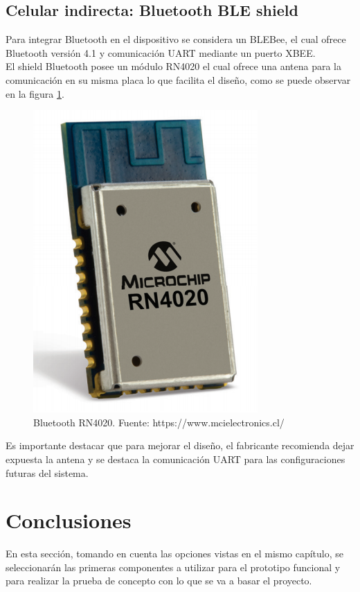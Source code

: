 \subsection{Celular indirecta: Bluetooth BLE shield}
Para integrar Bluetooth en el dispositivo se considera un BLEBee, el cual ofrece Bluetooth versión 4.1 y comunicación UART mediante un puerto XBEE. \\
El shield Bluetooth posee un módulo RN4020\cite{RN4020} el cual ofrece una antena para la comunicación en su misma placa lo que facilita el diseño, como se puede observar en la figura \ref{bt}.

\begin{figure}[H]
	\centering
	\includegraphics[scale=0.5]{figuras/com/rn4020.png}
	\caption{Bluetooth RN4020. Fuente: https://www.mcielectronics.cl/}
	\label{bt}
\end{figure}

Es importante destacar que para mejorar el diseño, el fabricante recomienda dejar expuesta la antena y se destaca la comunicación UART para las configuraciones futuras del sistema.

\newpage

\section{Conclusiones}
En esta sección, tomando en cuenta las opciones vistas en el mismo capítulo, se seleccionarán las primeras componentes a utilizar para el prototipo funcional y para realizar la prueba de concepto con lo que se va a basar el proyecto.
